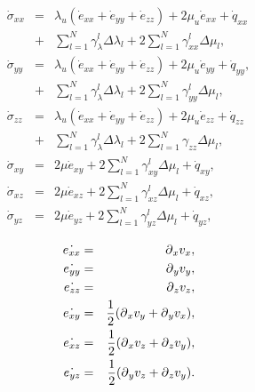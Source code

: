 \documentclass[11pt]{article}
\begin{document}
\begin{eqnarray}
  \dot{\sigma}_{xx} 
    & = & \lambda_u \left (\dot{e}_{xx} + \dot{e}_{yy} + \dot{e}_{zz}\right)
         + 2\mu_u \dot{e}_{xx} +\dot{q}_{xx}                 \nonumber\\
    & + & \sum_{l=1}^N\gamma^l_{\lambda}\Delta\lambda_l  
         + 2\sum_{l=1}^N\gamma^l_{xx}\Delta\mu_l,            \nonumber\\
  \dot{\sigma}_{yy} 
    & = & \lambda_u 
         \left (\dot{e}_{xx} + \dot{e}_{yy} + \dot{e}_{zz}\right)
         + 2\mu_u \dot{e}_{yy} +\dot{q}_{yy},                     \nonumber\\
    & + & \sum_{l=1}^N\gamma^l_{\lambda}\Delta\lambda_l  
         + 2\sum_{l=1}^N\gamma^l_{yy}\Delta\mu_l,                 \nonumber\\
  \dot{\sigma}_{zz} 
    & = & \lambda_u \left (\dot{e}_{xx} + \dot{e}_{yy} 
         + \dot{e}_{zz}\right)+ 2\mu_u \dot{e}_{zz} +\dot{q}_{zz} \nonumber\\
    & + & \sum_{l=1}^N\gamma^l_{\lambda}\Delta\lambda_l  
         + 2\sum_{l=1}^N\gamma_{zz}\Delta\mu_l,                   \nonumber\\
  \dot{\sigma}_{xy} 
    & = & 2\mu \dot{e}_{xy} + 2\sum_{l=1}^N\gamma^l_{xy}
          \Delta\mu_l+\dot{q}_{xy}                                \nonumber,\\
  \dot{\sigma}_{xz} 
    & = & 2\mu \dot{e}_{xz} + 2\sum_{l=1}^N\gamma^l_{xz}
          \Delta\mu_l+\dot{q}_{xz}                                \nonumber,\\
  \dot{\sigma}_{yz} 
    & = & 2\mu \dot{e}_{yz} + 2\sum_{l=1}^N\gamma^l_{yz}
          \Delta\mu_l+\dot{q}_{yz}                                \nonumber,\\
\end{eqnarray} 
\begin{eqnarray}
    \dot{e_{xx}} & = & \mbox{$\partial$}_x v_x, \nonumber\\
    \dot{e_{yy}} & = & \mbox{$\partial$}_y v_y, \nonumber\\
    \dot{e_{zz}} & = & \mbox{$\partial$}_z v_z, \nonumber\\
    \dot{e_{xy}} & = & \frac{1}{2}(\mbox{$\partial$}_x v_y + \mbox{$\partial$}_y v_x),\nonumber\\
    \dot{e_{xz}} & = & \frac{1}{2}(\mbox{$\partial$}_x v_z + \mbox{$\partial$}_z v_y),\nonumber\\
    \dot{e_{yz}} & = & \frac{1}{2}(\mbox{$\partial$}_y v_z + \mbox{$\partial$}_z v_y).\nonumber\\
\end{eqnarray}

\end{document}
